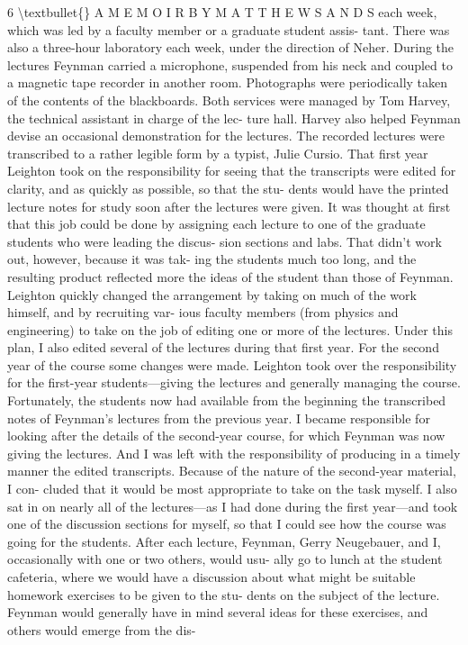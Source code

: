 \documentclass[10pt,oneside]{article}
\begin{document}
6 \textbackslash{}textbullet\{\} A  M E M O I R  B Y  M A T T H E W  S A N D S each week, which was led by a faculty member or a graduate student assis- tant. There was also a three-hour laboratory each week, under the direction of Neher. During the lectures Feynman carried a microphone, suspended from his neck and coupled to a magnetic tape recorder in another room. Photographs were periodically taken of the contents of the blackboards. Both services were managed by Tom Harvey, the technical assistant in charge of the lec- ture hall. Harvey also helped Feynman devise an occasional demonstration for the lectures. The recorded lectures were transcribed to a rather legible form by a typist, Julie Cursio. That first year Leighton took on the responsibility for seeing that the transcripts were edited for clarity, and as quickly as possible, so that the stu- dents would have the printed lecture notes for study soon after the lectures were given. It was thought at first that this job could be done by assigning each lecture to one of the graduate students who were leading the discus- sion sections and labs. That didn’t work out, however, because it was tak- ing the students much too long, and the resulting product reflected more the ideas of the student than those of Feynman. Leighton quickly changed the arrangement by taking on much of the work himself, and by recruiting var- ious faculty members (from physics and engineering) to take on the job of editing one or more of the lectures. Under this plan, I also edited several of the lectures during that first year. For the second year of the course some changes were made. Leighton took over the responsibility for the first-year students---giving the lectures and generally managing the course. Fortunately, the students now had available from the beginning the transcribed notes of Feynman’s lectures from the previous year. I became responsible for looking after the details of the second-year course, for which Feynman was now giving the lectures. And I was left with the responsibility of producing in a timely manner the edited transcripts. Because of the nature of the second-year material, I con- cluded that it would be most appropriate to take on the task myself. I also sat in on nearly all of the lectures---as I had done during the first year---and took one of the discussion sections for myself, so that I could see how the course was going for the students. After each lecture, Feynman, Gerry Neugebauer, and I, occasionally with one or two others, would usu- ally go to lunch at the student cafeteria, where we would have a discussion about what might be suitable homework exercises to be given to the stu- dents on the subject of the lecture. Feynman would generally have in mind several ideas for these exercises, and others would emerge from the dis-\par
\end{document}
